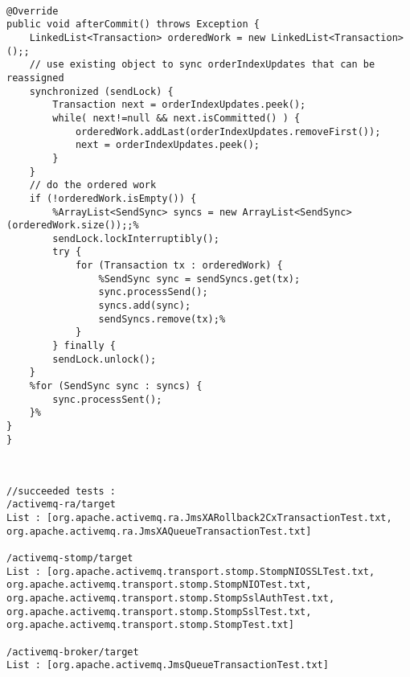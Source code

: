 \documentclass{article}
\begin{document}
\begin{lstlisting}[frame=single]

@Override
public void afterCommit() throws Exception {
	LinkedList<Transaction> orderedWork = new LinkedList<Transaction>();;
	// use existing object to sync orderIndexUpdates that can be reassigned
	synchronized (sendLock) {
		Transaction next = orderIndexUpdates.peek();
		while( next!=null && next.isCommitted() ) {
			orderedWork.addLast(orderIndexUpdates.removeFirst());
			next = orderIndexUpdates.peek();
		}
	}
	// do the ordered work
	if (!orderedWork.isEmpty()) {
		%ArrayList<SendSync> syncs = new ArrayList<SendSync>(orderedWork.size());;%
		sendLock.lockInterruptibly();
		try {
			for (Transaction tx : orderedWork) {
				%SendSync sync = sendSyncs.get(tx);
				sync.processSend();
				syncs.add(sync);
				sendSyncs.remove(tx);%
			}
		} finally {
		sendLock.unlock();
	}
	%for (SendSync sync : syncs) {
		sync.processSent();
	}%
}
}

\end{lstlisting}
\begin{lstlisting}[frame=single]


//succeeded tests :
/activemq-ra/target
List : [org.apache.activemq.ra.JmsXARollback2CxTransactionTest.txt, 
org.apache.activemq.ra.JmsXAQueueTransactionTest.txt]

/activemq-stomp/target
List : [org.apache.activemq.transport.stomp.StompNIOSSLTest.txt, 
org.apache.activemq.transport.stomp.StompNIOTest.txt, 
org.apache.activemq.transport.stomp.StompSslAuthTest.txt, 
org.apache.activemq.transport.stomp.StompSslTest.txt, 
org.apache.activemq.transport.stomp.StompTest.txt]

/activemq-broker/target
List : [org.apache.activemq.JmsQueueTransactionTest.txt]

\end{lstlisting}
\end{document}
